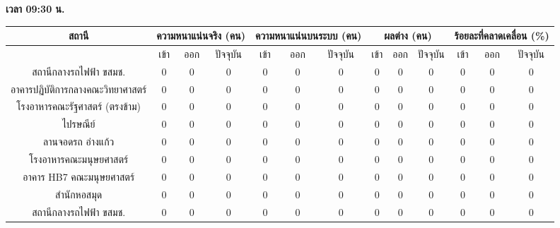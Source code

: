     \textbf{เวลา 09:30 น.}
    {\tiny\begin{center}
        \begin{tabular}{ | c | c | c | c | c | c | c | c | c | c | c | c | c |  }
            \hline
                \multirow{2}{*}{สถานี} & \multicolumn{3}{|c|}{ความหนาแน่นจริง (คน)} & \multicolumn{3}{|c|}{ความหนาแน่นบนระบบ (คน)} & \multicolumn{3}{|c|}{ผลต่าง (คน)} & \multicolumn{3}{|c|}{ร้อยละที่คลาดเคลื่อน (\%)} \\
            \hline
                & เข้า & ออก & ปัจจุบัน & เข้า & ออก & ปัจจุบัน & เข้า & ออก & ปัจจุบัน & เข้า & ออก & ปัจจุบัน \\
            \hline
                สถานีกลางรถไฟฟ้า ขสมช.            & 0 & 0 & 0 & 0 & 0 & 0 & 0 & 0 & 0 & 0 & 0 & 0 \\
                อาคารปฏิบัติการกลางคณะวิทยาศาสตร์    & 0 & 0 & 0 & 0 & 0 & 0 & 0 & 0 & 0 & 0 & 0 & 0 \\
                โรงอาหารคณะรัฐศาสตร์ (ตรงข้าม)      & 0 & 0 & 0 & 0 & 0 & 0 & 0 & 0 & 0 & 0 & 0 & 0 \\
                ไปรษณีย์                          & 0 & 0 & 0 & 0 & 0 & 0 & 0 & 0 & 0 & 0 & 0 & 0 \\
                ลานจอดรถ อ่างแก้ว                  & 0 & 0 & 0 & 0 & 0 & 0 & 0 & 0 & 0 & 0 & 0 & 0 \\
                โรงอาหารคณะมนุษยศาสตร์            & 0 & 0 & 0 & 0 & 0 & 0 & 0 & 0 & 0 & 0 & 0 & 0 \\
                อาคาร HB7 คณะมนุษยศาสตร์          & 0 & 0 & 0 & 0 & 0 & 0 & 0 & 0 & 0 & 0 & 0 & 0 \\
                สำนักหอสมุด                       & 0 & 0 & 0 & 0 & 0 & 0 & 0 & 0 & 0 & 0 & 0 & 0 \\
                สถานีกลางรถไฟฟ้า ขสมช.            & 0 & 0 & 0 & 0 & 0 & 0 & 0 & 0 & 0 & 0 & 0 & 0 \\
            \hline
        \end{tabular}
    \end{center}}

